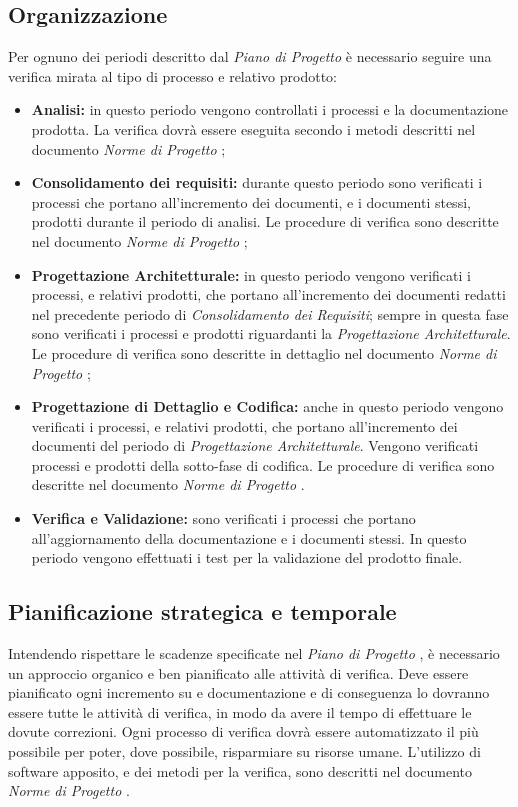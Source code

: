   \subsection{Organizzazione}
    Per ognuno dei periodi descritto dal \emph{Piano di Progetto \VersionePP{}}
    è necessario seguire una verifica mirata al tipo di processo e relativo
    prodotto:
    \begin{itemize}
      \item \textbf{Analisi:} in questo periodo vengono controllati i processi e
      la documentazione prodotta. La verifica dovrà essere eseguita secondo i
      metodi descritti nel documento \emph{Norme di Progetto \VersioneNP{}};
      \item \textbf{Consolidamento dei requisiti:} durante questo periodo sono
      verificati i processi che portano all'incremento dei documenti, e i
      documenti stessi, prodotti durante il periodo di analisi.
      Le procedure di verifica sono descritte nel documento
      \emph{Norme di Progetto \VersioneNP{}};
      \item \textbf{Progettazione Architetturale:} in questo periodo vengono
      verificati i processi, e relativi prodotti, che portano all'incremento dei
      documenti redatti nel precedente periodo di \emph{Consolidamento dei Requisiti};
      sempre in questa fase sono verificati i processi e prodotti riguardanti la
      \emph{Progettazione Architetturale}. Le procedure di verifica sono descritte
      in dettaglio nel documento \emph{Norme di Progetto \VersioneNP{}};
      \item \textbf{Progettazione di Dettaglio e Codifica:} anche in questo
      periodo vengono verificati i processi, e relativi prodotti, che portano
      all'incremento dei documenti del periodo di \emph{Progettazione Architetturale}.
      Vengono verificati processi e prodotti della sotto-fase di codifica. Le
      procedure di verifica sono descritte nel documento
      \emph{Norme di Progetto \VersioneNP{}}.
      \item \textbf{Verifica e Validazione:} sono verificati i processi che
      portano all'aggiornamento della documentazione e i documenti stessi. In
      questo periodo vengono effettuati i test per la validazione del prodotto
      finale.
    \end{itemize}

  \subsection{Pianificazione strategica e temporale}
    Intendendo rispettare le scadenze specificate nel \emph{Piano di Progetto
    \VersionePP{}}, è necessario un approccio organico e ben pianificato alle
    attività di verifica. Deve essere pianificato ogni incremento su
     e documentazione e di conseguenza lo dovranno essere
    tutte le attività di verifica, in modo da avere il tempo di effettuare le
    dovute correzioni. Ogni processo di verifica dovrà essere automatizzato il
    più possibile per poter, dove possibile, risparmiare su risorse umane.
    L'utilizzo di software apposito, e dei metodi per la verifica, sono descritti
    nel documento \emph{Norme di Progetto \VersioneNP{}}.



